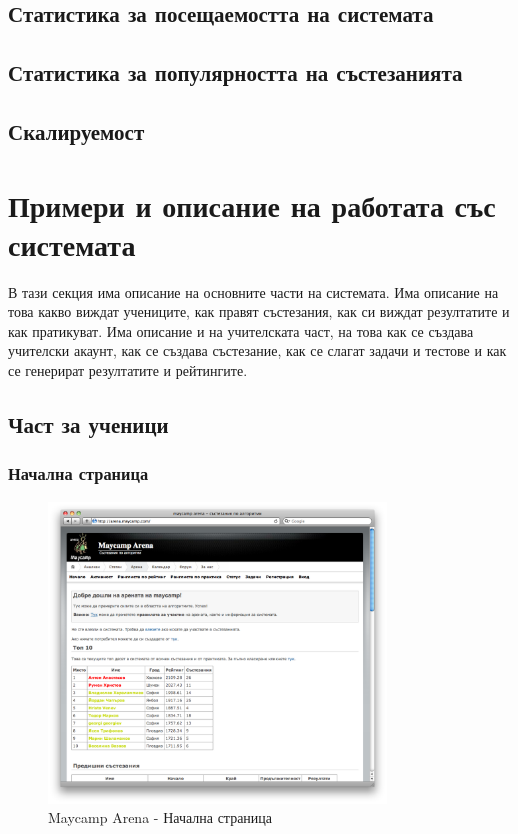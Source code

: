\documentclass[a4paper,12pt]{article}
\begin{document}
  \subsection{Статистика за посещаемостта на системата}
  \subsection{Статистика за популярността на състезанията}
  \subsection{Скалируемост}
  \section{Примери и описание на работата със системата}
  В тази секция има описание на основните части на системата. Има описание на това какво виждат учениците, как правят състезания, как си виждат резултатите и как пратикуват. Има описание и на учителската част, на това как се създава учителски акаунт, как се създава състезание, как се слагат задачи и тестове и как се генерират резултатите и рейтингите.
  \subsection{Част за ученици}
  \subsubsection{Начална страница}
  \begin{figure}[ht]
    \begin{center}
      \includegraphics[width=0.8\textwidth]{maycamp_arena_home.png}
    \end{center}
    \caption{Maycamp Arena - Начална страница}
    \label{arena_homepage}
  \end{figure}
\end{document}
